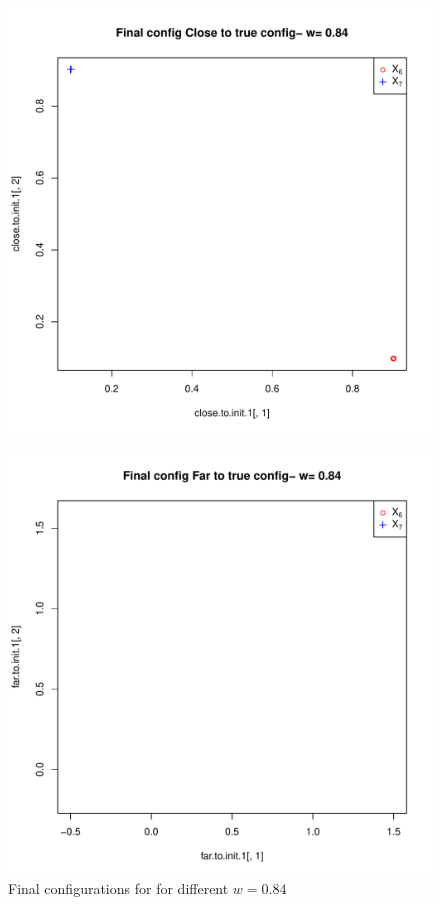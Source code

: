\documentclass[12pt,oneside,final]{thesis}\usepackage[]{graphicx}\usepackage[]{color}
\begin{document}
\begin{figure}
\begin{minipage}[b]{0.5\linewidth}
\centering
\includegraphics[scale=0.45]{true-min-w0_84.pdf}

\label{fig:figure2-1}
\end{minipage}
\hspace{0.5cm}
\begin{minipage}[b]{0.5\linewidth}
\centering
\includegraphics[scale=0.45]{other-min-w0_84.pdf}


\end{minipage}

\caption{Final configurations for for different $w=0.84$ }
\label{fig:Finalconfig-MultMin-w-0_84}

\end{figure}
\end{document}
